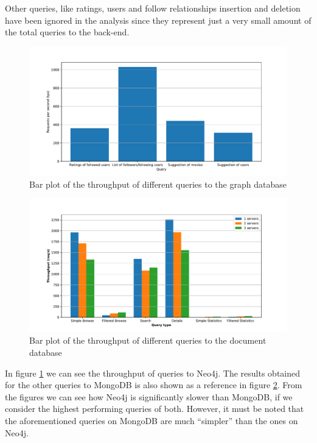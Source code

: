 \documentclass[11pt]{article}
\begin{document}
Other queries, like ratings, users and follow relationships insertion and 
deletion have been ignored in the analysis since they represent just a very 
small amount of the total queries to the back-end.

\begin{figure}[]
    \centering
    \includegraphics[width=\textwidth]{figs/tps_query.pdf}
    \caption{Bar plot of the throughput of different queries to the graph database}
    \label{fig:queries-graph}
\end{figure}

\begin{figure}[]
    \centering
    \includegraphics[width=\textwidth]{figs/siege_barplot_all.pdf}
    \caption{Bar plot of the throughput of different queries to the document database}
    \label{fig:queries-mongo}
\end{figure}

In figure \ref{fig:queries-graph} we can see the throughput of queries to Neo4j.
The results obtained for the other queries to MongoDB is also shown as a
reference in figure \ref{fig:queries-mongo}. From the figures we can see how 
Neo4j is significantly slower than MongoDB, if we consider the highest 
performing queries of both. However, it must be noted that the aforementioned
queries on MongoDB are much ``simpler'' than the ones on Neo4j.
\end{document}
